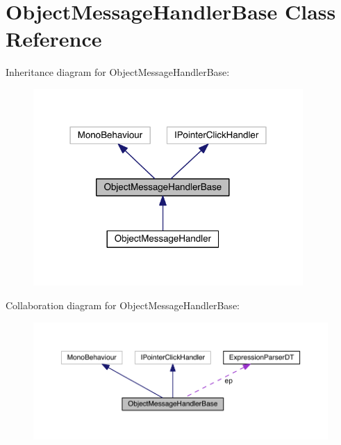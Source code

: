 \hypertarget{class_object_message_handler_base}{}\section{Object\+Message\+Handler\+Base Class Reference}
\label{class_object_message_handler_base}


Inheritance diagram for Object\+Message\+Handler\+Base\+:\nopagebreak
\begin{figure}[H]
\begin{center}
\leavevmode
\includegraphics[width=291pt]{class_object_message_handler_base__inherit__graph}
\end{center}
\end{figure}


Collaboration diagram for Object\+Message\+Handler\+Base\+:\nopagebreak
\begin{figure}[H]
\begin{center}
\leavevmode
\includegraphics[width=350pt]{class_object_message_handler_base__coll__graph}
\end{center}
\end{figure}
